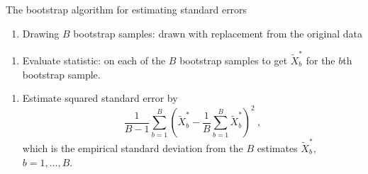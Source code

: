 \documentclass[10pt,ignorenonframetext,]{beamer}
\providecommand{\tightlist}{%
  \setlength{\itemsep}{0pt}\setlength{\parskip}{0pt}}
\begin{document}
\begin{frame}

\begin{block}{The bootstrap algorithm for estimating standard errors}

\vspace{2mm}

\begin{enumerate}
\def\labelenumi{\arabic{enumi}.}
\tightlist
\item
  Drawing \(B\) bootstrap samples: drawn with replacement from the
  original data
\end{enumerate}

\vspace{1mm}

\begin{enumerate}
\def\labelenumi{\arabic{enumi}.}
\setcounter{enumi}{1}
\tightlist
\item
  Evaluate statistic: on each of the \(B\) bootstrap samples to get
  \(\tilde{X}^*_b\) for the \(b\)th bootstrap sample.
\end{enumerate}

\vspace{1mm}

\begin{enumerate}
\def\labelenumi{\arabic{enumi}.}
\setcounter{enumi}{2}
\tightlist
\item
  Estimate squared standard error by
  \[\frac{1}{B-1}\sum_{b=1}^B (\tilde{X}^*_b-\frac{1}{B}\sum_{b=1}^B \tilde{X}^*_b)^2 \ ,\]
  which is the empirical standard deviation from the \(B\) estimates
  \(\tilde{X}^*_b\), \(b=1,\ldots,B\).
\end{enumerate}

\end{block}

\end{frame}
\end{document}
